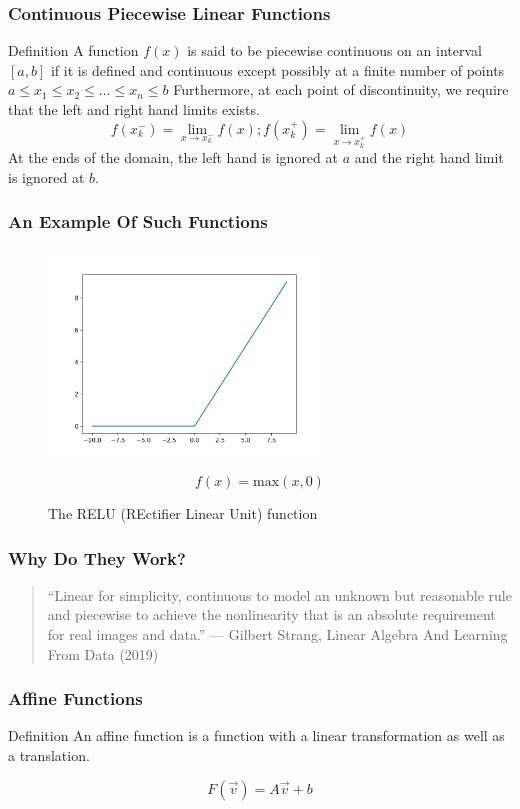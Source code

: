 \documentclass{beamer}
\begin{document}
\begin{frame}
\frametitle{Continuous Piecewise Linear Functions}
\begin{block}{Definition}
   A function $f(x)$ is said to be piecewise continuous on an interval $[a,b]$ if it is defined and continuous except possibly at a finite number of points $a\leq x_1 \leq x_2 \leq \dots \leq x_n \leq b$ Furthermore, at each point of discontinuity, we require that the left and right hand limits exists.
   \[
      f(x_k^-) = \lim_{x \rightarrow x_k^-} f(x); f(x_k^+) = \lim_{x\rightarrow x_k^+} f(x)
   \]
   At the ends of the domain, the left hand is ignored at $a$ and the right hand limit is ignored at $b$.
 \end{block}
\end{frame}
\begin{frame}
\frametitle{An Example Of Such Functions}
\begin{figure}[htbp]
\centerline{\includegraphics[width=0.65\textwidth]{figures/ReLU.png}}
\caption[The RELU function]{\label{fig:RelUActivation} The RELU (REctifier Linear Unit) function}

\[f(x) = \text{max}(x,0)\]
\end{figure}
\end{frame}
\begin{frame}
  \frametitle{Why Do They Work?}
\begin{quote}
``Linear for simplicity, continuous to model an unknown but reasonable rule and piecewise to achieve the nonlinearity that is an absolute requirement for real images and data.'' --- Gilbert Strang, Linear Algebra And Learning From Data (2019)
\end{quote}
\end{frame}

\begin{frame}
  \frametitle{Affine Functions}
  \begin{block}{Definition}
    An affine function is a function with a linear transformation as well as a translation.

    $$F(\vec{v}) = A \vec{v}+ b $$
\end{block}
\end{frame}
\end{document}
